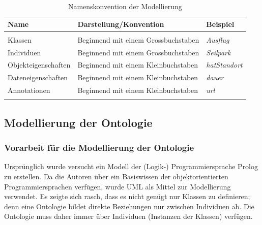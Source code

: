 \begin{table}[H]%
    \centering
    \begin{tabular}{l l l}
        \toprule{}
        \textbf{Name}       & \textbf{Darstellung/Konvention}       & \textbf{Beispiel}\\
        \midrule{}\\
        Klassen             & Beginnend mit einem Grossbuchstaben   & \textit{Ausflug}\\
        Individuen          & Beginnend mit einem Grossbuchstaben   & \textit{Seilpark}\\
        Objekteigenschaften & Beginnend mit einem Kleinbuchstaben   & \textit{hatStandort}\\
        Dateneigenschaften  & Beginnend mit einem Kleinbuchstaben   & \textit{dauer}\\
        Annotationen        & Beginnend mit einem Kleinbuchstaben   & \textit{url}\\
        \bottomrule{}
    \end{tabular}
    \caption{Namenskonvention der Modellierung}
\label{tab:vorgehen:grndlagen:technisch:konvention}
\end{table}%


\subsection{Modellierung der Ontologie}
\label{sub:modellierung_der_ontologie}

\subsubsection{Vorarbeit für die Modellierung der Ontologie}
\label{sub:modellierung_der_ontologie_vorarbeit}
Ursprünglich wurde versucht ein Modell der (Logik-) Programmiersprache Prolog zu erstellen. Da die Autoren über ein Basiswissen der objektorientierten Programmiersprachen verfügen, wurde UML als Mittel zur Modellierung verwendet. Es zeigte sich rasch, dass es nicht genügt nur Klassen zu definieren; denn eine Ontologie bildet direkte Beziehungen nur zwischen Individuen ab. Die Ontologie muss daher immer über Individuen (Instanzen der Klassen) verfügen.

